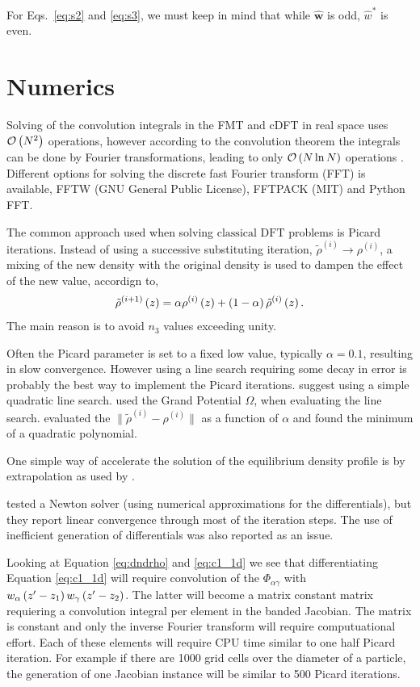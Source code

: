 \documentclass[12pt, letterpaper]{article}
\newcommand*{\lb}{\ensuremath{\left(}}
\newcommand*{\rb}{\ensuremath{\right)}}
\newcommand{\cdft}{\ensuremath{\text{classical DFT}}\xspace}
\begin{document}
For Eqs.~\ref{eq:s2} and \ref{eq:s3}, we must keep in mind that while $\hat{\mathbf{w}}$ is odd, $\hat{w}^*$ is even. 


\section{Numerics}

Solving of the convolution integrals in the FMT and cDFT in real space
uses $\mathcal{O}\lb N^2 \rb$ operations, however according to the
convolution theorem the integrals can be done by Fourier
transformations, leading to only $\mathcal{O}\lb N \ln N \rb$
operations \cite{roth2010, knepley2010}. Different options for solving
the discrete fast Fourier transform (FFT) is available, FFTW (GNU
General Public License), FFTPACK (MIT) and Python FFT.

The common approach used when solving \cdft problems is Picard
iterations. Instead of using a successive substituting iteration,
$\tilde{\rho}^{(i)} \rightarrow \rho^{(i)}$, a mixing of the new
density with the original density is used to dampen the effect of the
new value, accordign to,
\begin{equation}
  \tilde{\rho}^{(i+1)}\lb z \rb = \alpha \rho^{(i)}\lb z \rb + \lb 1 - \alpha \rb \tilde{\rho}^{(i)}\lb z \rb.
\end{equation}
The main reason is to avoid $n_3$ values exceeding unity.

Often the Picard parameter is set to a fixed low value, typically
$\alpha=0.1$, resulting in slow convergence. However using a line
search requiring some decay in error is probably the best way to
implement the Picard iterations. \citet{roth2010} suggest using a
simple quadratic line search. \citet{roth2010} used the Grand
Potential $\Omega$, when evaluating the line
search. \cite{knepley2010} evaluated the
$\| \tilde{\rho}^{(i)} - \rho^{(i)} \|$ as a function of $\alpha$ and
found the minimum of a quadratic polynomial.

One simple way of accelerate the solution of the equilibrium density
profile is by extrapolation as used by \citet{ng1974}.

\cite{knepley2010} tested a Newton solver (using numerical
approximations for the differentials), but they report linear
convergence through most of the iteration steps. The use of
inefficient generation of differentials was also reported as an issue.

Looking at Equation \eqref{eq:dndrho} and \eqref{eq:c1_1d} we see that
differentiating Equation \eqref{eq:c1_1d} will require convolution of
the $\Phi_{\alpha\gamma}$ with
$w_\alpha \lb z^\prime - z_1\rb w_\gamma \lb z^\prime - z_2\rb$. The
latter will become a matrix constant matrix requiering a convolution
integral per element in the banded Jacobian. The matrix is constant
and only the inverse Fourier transform will require computuational
effort. Each of these elements will require CPU time similar to one
half Picard iteration. For example if there are 1000 grid cells over
the diameter of a particle, the generation of one Jacobian instance
will be similar to 500 Picard iterations.
\end{document}
